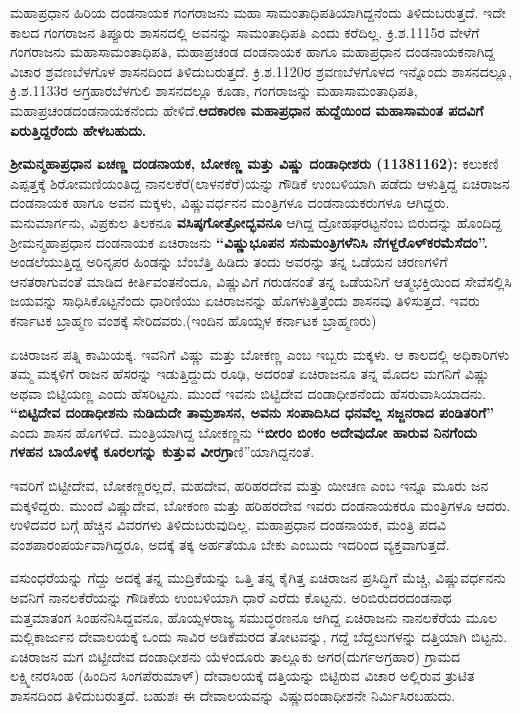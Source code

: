 ಮಹಾಪ್ರಧಾನ ಹಿರಿಯ ದಂಡನಾಯಕ ಗಂಗರಾಜನು ಮಹಾ ಸಾಮಂತಾಧಿಪತಿಯಾಗಿದ್ದನೆಂದು ತಿಳಿದುಬರುತ್ತದೆ. ಇದೇ ಕಾಲದ ಗಂಗರಾಜನ ತಿಪ್ಪೂರು ಶಾಸನದಲ್ಲಿ ಅವನನ್ನು ಸಾಮಂತಾಧಿಪತಿ ಎಂದು ಕರೆದಿಲ್ಲ. ಕ್ರಿ.ಶ.1115ರ ವೇಳೆಗೆ ಗಂಗರಾಜನು ಮಹಾಸಾಮಂತಾಧಿಪತಿ, ಮಹಾಪ್ರಚಂಡ ದಂಡನಾಯಕ ಹಾಗೂ ಮಹಾಪ್ರಧಾನ ದಂಡನಾಯಕನಾಗಿದ್ದ ವಿಚಾರ ಶ್ರವಣಬೆಳಗೊಳ ಶಾಸನದಿಂದ ತಿಳಿದುಬರುತ್ತದೆ. ಕ್ರಿ.ಶ.1120ರ ಶ್ರವಣಬೆಳಗೊಳದ ಇನ್ನೊಂದು ಶಾಸನದಲ್ಲೂ, ಕ್ರಿ.ಶ.1133ರ ಅಗ್ರಹಾರಬೆಳಗುಲಿ ಶಾಸನದಲ್ಲೂ ಕೂಡಾ, ಗಂಗರಾಜನ್ನು ಮಹಾಸಾಮಂತಾಧಿಪತಿ, ಮಹಾಪ್ರಚಂಡ\break ದಂಡನಾಯಕನೆಂದು ಹೇಳಿದೆ.\textbf{ಆದಕಾರಣ ಮಹಾಪ್ರಧಾನ ಹುದ್ದೆಯಿಂದ ಮಹಾಸಾಮಂತ ಪದವಿಗೆ ಏರುತ್ತಿದ್ದರೆಂದು ಹೇಳಬಹುದು.}

\textbf{ಶ‍್ರೀಮನ್ಮಹಾಪ್ರಧಾನ ಏಚಣ್ಣ ದಂಡನಾಯಕ, ಬೋಕಣ್ಣ ಮತ್ತು ವಿಷ್ಣು ದಂಡಾಧೀಶರು (1138\general{\enginline{-}}1162):} ಕಲುಕಣಿ ಎಪ್ಪತ್ತಕ್ಕೆ ಶಿರೋಮಣಿಯಂತಿದ್ದ ನಾನಲಕೆರೆ(ಲಾಳನಕೆರೆ)ಯನ್ನು ಗೌಡಿಕೆ ಉಂಬಳಿಯಾಗಿ ಪಡೆದು ಆಳುತ್ತಿದ್ದ ಏಚಿರಾಜನ ದಂಡನಾಯಕ ಹಾಗೂ ಅವನ ಮಕ್ಕಳು, ವಿಷ್ಣುವರ್ಧನನ ಮಂತ್ರಿಗಳೂ ದಂಡನಾಯಕರುಗಳೂ ಆಗಿದ್ದರು. ಮನುಮಾರ್ಗನು, ವಿಪ್ರಕುಲ ತಿಲಕನೂ \textbf{ವಸಿಷ್ಠಗೋತ್ರೋದ್ಭವನೂ} ಆಗಿದ್ದ ದ್ರೋಹಘರಟ್ಟನೆಂಬ ಬಿರುದನ್ನು ಹೊಂದಿದ್ದ ಶ‍್ರೀಮನ್ಮಹಾಪ್ರಧಾನ ದಂಡನಾಯಕ ಏಚಿರಾಜನು \textbf{“ವಿಷ್ಣುಭೂಪನ ಸನುಮಂತ್ರಿಗಳೆನಿಸಿ ನೆಗಳ್ದರೊಳ್​ ಕರಮೆಸೆದಂ”. } ಅಂಡಲೆಯುತ್ತಿದ್ದ ಅರಿನೃಪರ ಹಿಂಡನ್ನು ಬೆಂಬೆತ್ತಿ ಹಿಡಿದು ತಂದು ಅವರನ್ನು ತನ್ನ ಒಡೆಯನ ಚರಣಗಳಿಗೆ ಆನತರಾಗುವಂತೆ ಮಾಡಿದ ಕೀರ್ತಿವಂತನೆಂದೂ, ವಿಷ್ಣುವಿಗೆ ಗರುಡನಂತೆ ತನ್ನ ಒಡೆಯನಿಗೆ ಆತ್ಮಭಕ್ತಿಯಿಂದ ಸೇವೆಸಲ್ಲಿಸಿ ಜಯವನ್ನು ಸಾಧಿಸಿಕೊಟ್ಟನೆಂದು ಧಾರಿಣಿಯು ಏಚಿರಾಜನನ್ನು ಹೊಗಳುತ್ತಿತ್ತೆಂದು ಶಾಸನವು ತಿಳಿಸುತ್ತದೆ. ಇವರು ಕರ್ನಾಟಕ ಬ್ರಾಹ್ಮಣ ವಂಶಕ್ಕೆ ಸೇರಿದವರು.(ಇಂದಿನ ಹೊಯ್ಸಳ ಕರ್ನಾಟಕ ಬ್ರಾಹ್ಮಣರು)

ಏಚಿರಾಜನ ಪತ್ನಿ ಕಾಮಿಯಕ್ಕ. ಇವನಿಗೆ ವಿಷ್ಣು ಮತ್ತು ಬೋಕಣ್ಣ ಎಂಬ ಇಬ್ಬರು ಮಕ್ಕಳು. ಆ ಕಾಲದಲ್ಲಿ ಅಧಿಕಾರಿಗಳು ತಮ್ಮ ಮಕ್ಕಳಿಗೆ ರಾಜನ ಹೆಸರನ್ನು ಇಡುತ್ತಿದ್ದುದು ರೂಢಿ, ಅದರಂತೆ ಏಚಿರಾಜನೂ ತನ್ನ ಮೊದಲ ಮಗನಿಗೆ ವಿಷ್ಣು ಅಥವಾ ಬಿಟ್ಟಿಯಣ್ಣ ಎಂದು ಹೆಸರಿಟ್ಟನು. ಮುಂದೆ ಇವನು ಬಿಟ್ಟಿದೇವ ದಂಡಾಧೀಶನೆಂದು ಹೆಸರುವಾಸಿಯಾದನು. \textbf{“ಬಿಟ್ಟಿದೇವ ದಂಡಾಧೀಶನು ನುಡಿದುದೇ ತಾಮ್ರಶಾಸನ, ಅವನು ಸಂಪಾದಿಸಿದ ಧನವೆಲ್ಲ ಸಜ್ಜನರಾದ ಪಂಡಿತರಿಗೆ”} ಎಂದು ಶಾಸನ ಹೊಗಳಿದೆ. ಮಂತ್ರಿಯಾಗಿದ್ದ ಬೋಕಣ್ಣನು \textbf{“ಬೀರಂ ಬಿಂಕಂ ಅದೇವುದೋ ಹಾರುವ ನಿನಗೆಂದು ಗಳಹನ ಬಾಯೊಳಕ್ಕೆ ಕೂರಲಗನ್ನು ಕುತ್ತುವ ವೀರಗ್ರಾ}ಣಿ”ಯಾಗಿದ್ದನಂತೆ.

ಇವರಿಗೆ ಬಿಟ್ಟೀದೇವ, ಬೋಕಣ್ಣರಲ್ಲದೆ, ಮಹದೇವ, ಹರಿಹರದೇವ ಮತ್ತು ಯೀಚಣ ಎಂಬ ಇನ್ನೂ ಮೂರು ಜನ ಮಕ್ಕಳಿದ್ದರು. ಮುಂದೆ ವಿಷ್ಣುದೇವ, ಬೋಕಂಣ ಮತ್ತು ಹರಿಹರದೇವ ಇವರು ದಂಡನಾಯಕರೂ ಮಂತ್ರಿಗಳೂ ಆದರು. ಉಳಿದವರ ಬಗ್ಗೆ ಹೆಚ್ಚಿನ ವಿವರಗಳು ತಿಳಿದುಬರುವುದಿಲ್ಲ. ಮಹಾಪ್ರಧಾನ ದಂಡನಾಯಕ, ಮಂತ್ರಿ ಪದವಿ ವಂಶಪಾರಂಪರ್ಯವಾಗಿದ್ದರೂ, ಅದಕ್ಕೆ ತಕ್ಕ ಅರ್ಹತೆಯೂ ಬೇಕು ಎಂಬುದು ಇದರಿಂದ ವ್ಯಕ್ತವಾಗುತ್ತದೆ.

ವಸುಂಧರೆಯನ್ನು ಗೆದ್ದು ಅದಕ್ಕೆ ತನ್ನ ಮುದ್ರಿಕೆಯನ್ನು ಒತ್ತಿ ತನ್ನ ಕೈಗಿತ್ತ ಏಚಿರಾಜನ ಪ್ರಸಿದ್ಧಿಗೆ ಮೆಚ್ಚಿ, ವಿಷ್ಣುವರ್ಧನನು ಅವನಿಗೆ ನಾನಲಕೆರೆಯನ್ನು ಗೌಡಿಕೆಯ ಉಂಬಳಿಯಾಗಿ ಧಾರೆ ಎರೆದು ಕೊಟ್ಟನು. ಅರಿಬಿರುದರದಂಡನಾಥ ಮತ್ತಮಾತಂಗ ಸಿಂಹನೆನಿಸಿದ್ದವನೂ, ಹೊಯ್ಸಳರಾಜ್ಯ ಸಮುದ್ಧರಣನೂ ಆಗಿದ್ದ ಏಚಿರಾಜನು ನಾನಲಕೆರೆಯ ಮೂಲ ಮಲ್ಲಿಕಾರ್ಜುನ ದೇವಾಲಯಕ್ಕೆ ಒಂದು ಸಾವಿರ ಅಡಿಕೆಮರದ ತೋಟವನ್ನು, ಗದ್ದೆ ಬೆದ್ದಲುಗಳನ್ನು ದತ್ತಿಯಾಗಿ ಬಿಟ್ಟನು. ಏಚಿರಾಜನ ಮಗ ಬಿಟ್ಟೀದೇವ ದಂಡಾಧೀಶನು ಯೆಳಂದೂರು ತಾಲ್ಲೂಕು ಅಗರ(ದುರ್ಗಅಗ್ರಹಾರ) ಗ್ರಾಮದ ಲಕ್ಷ್ಮೀನರಸಿಂಹ (ಹಿಂದಿನ ಸಿಂಗಪೆರುಮಾಳ್​) ದೇವಾಲಯಕ್ಕೆ ದತ್ತಿಯನ್ನು ಬಿಟ್ಟಿರುವ ವಿಚಾರ ಅಲ್ಲಿರುವ ತ್ರುಟಿತ ಶಾಸನದಿಂದ ತಿಳಿದುಬರುತ್ತದೆ. ಬಹುಶಃ ಈ ದೇವಾಲಯವನ್ನು ವಿಷ್ಣುದಂಡಾಧೀಶನೇ ನಿರ್ಮಿಸಿರಬಹುದು.

